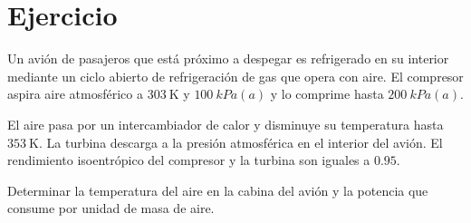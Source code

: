 \section{Ejercicio}\label{ej:Chap11Ejercicio18}

Un avión de pasajeros que está próximo a despegar es refrigerado en su interior mediante un ciclo abierto de refrigeración de gas que opera con aire. El compresor aspira aire atmosférico a $\SI{303}{\kelvin}$ y $\SI{100}{kPa(a)}$ y lo comprime hasta $\SI{200}{kPa(a)}$. 

El aire pasa por un intercambiador de calor y disminuye su temperatura hasta $\SI{353}{\kelvin}$. La turbina descarga a la presión atmosférica en el interior del avión. El rendimiento isoentrópico del compresor y la turbina son iguales a $0.95$.

Determinar la temperatura del aire en la cabina del avión y la potencia que consume por unidad de masa de aire.